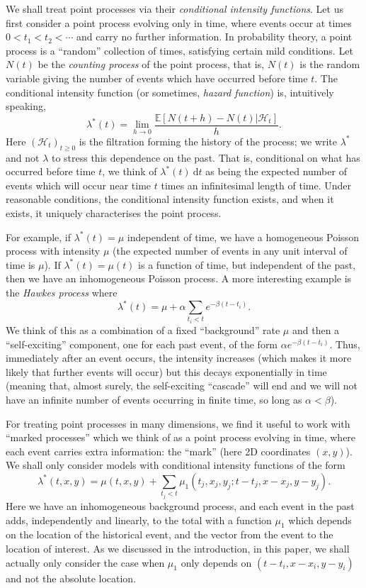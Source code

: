 \documentclass[twoside,a4paper]{article}
\theoremstyle{plain}
\theoremstyle{definition}
\newcommand{\mc}{\mathcal}
\newcommand{\rd}{\textrm{d}}
\begin{document}
We shall treat point processes via their \emph{conditional intensity functions}.
Let us first consider a point process evolving only in time, where events occur at times
$0 < t_1 < t_2 < \cdots $ and carry no further information.  In probability theory, a point
process is a ``random'' collection of times, satisfying certain mild conditions.  Let $N(t)$
be the \emph{counting process} of the point process, that is, $N(t)$ is the random variable
giving the number of events which have occurred before time $t$.  The conditional intensity 
function (or sometimes, \emph{hazard function}) is, intuitively speaking,
\[ \lambda^*(t) = \lim_{h\rightarrow 0} \frac{\mathbb E[ N(t+h) - N(t) | \mc H_t ]}{h}. \]
Here $(\mc H_t)_{t\geq 0}$ is the filtration forming the history of the process; we write 
$\lambda^*$ and not $\lambda$ to stress this dependence on the past.
That is, conditional on what has occurred before time $t$, we think of
$\lambda^*(t) \ \rd t$ as being the expected number of events which will occur near time
$t$ times an infinitesimal length of time.  Under reasonable conditions, the conditional 
intensity function exists, and when it exists, it uniquely characterises the point process.

For example, if $\lambda^*(t) = \mu$ independent of time, we have a homogeneous Poisson
process with intensity $\mu$ (the expected number of events in any unit interval of time is
$\mu$).  If $\lambda^*(t) = \mu(t)$ is a function of time, but independent of the past, 
then we have an inhomogeneous Poisson process.  A more interesting example is the
\emph{Hawkes process} where
\[ \lambda^*(t) = \mu + \alpha \sum_{t_i < t} e^{-\beta(t-t_i)}. \]
We think of this as a combination of a fixed ``background'' rate $\mu$ and then a 
``self-exciting'' component, one for each past event, of the form $\alpha e^{-\beta(t-t_i)}$.
Thus, immediately after an event occurs, the intensity increases (which makes it more likely
that further events will occur) but this decays exponentially in time (meaning that, almost
surely, the self-exciting ``cascade'' will end and we will not have an infinite number of
events occurring in finite time, so long as $\alpha < \beta$).

For treating point processes in many dimensions, we find it useful to work with ``marked
processes'' which we think of as a point process evolving in time, where each event carries
extra information: the ``mark'' (here 2D coordinates $(x,y)$).  
We shall only consider models with conditional intensity functions of the form
\begin{equation}
\lambda^*(t,x,y) = \mu(t,x,y) + \sum_{t_j<t} \mu_1(t_j,x_j,y_j;t-t_j,x-x_j,y-y_j).
\label{eq:main}
\end{equation}
Here we have an inhomogeneous background process, and each event in the past adds,
independently and linearly, to the total with a function $\mu_1$ which depends on the
location of the historical event, and the vector from the event to the location of interest.
As we discussed in the introduction, in this paper, we shall actually only consider
the case when $\mu_1$ only depends on $(t-t_i,x-x_i,y-y_i)$ and not the absolute location.
\end{document}
